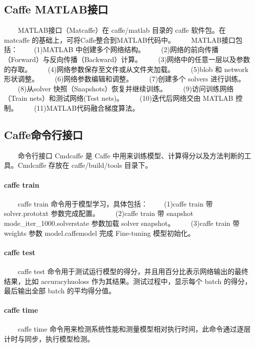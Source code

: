 \subsection{ Caffe MATLAB接口}\label{caffe-matlabux63a5ux53e3}

  MATLAB接口（Matcaffe）在 caffe/matlab 目录的 caffe 软件包。在 matcaffe
的基础上，可将Caffe整合到MATLAB代码中。   MATLAB接口包括：   (1)MATLAB
中创建多个网络结构。
  (2)网络的前向传播（Forward）与反向传播（Backward）计算。
  (3)网络中的任意一层以及参数的存取。
  (4)网络参数保存至文件或从文件夹加载。   (5)blob 和 network 形状调整。
  (6)网络参数编辑和调整。   (7)创建多个 solvers 进行训练。   (8)从solver
快照（Snapshots）恢复并继续训练。   (9)访问训练网络（Train
nets）和测试网络(Test nets)。   (10)迭代后网络交由 MATLAB 控制。
  (11)MATLAB代码融合梯度算法。

\subsection{Caffe命令行接口}\label{caffe-ux547dux4ee4ux884cux63a5ux53e3}

  命令行接口 Cmdcaffe 是 Caffe
中用来训练模型、计算得分以及方法判断的工具。Cmdcaffe 存放在
caffe/build/tools 目录下。

\paragraph{caffe train}\label{caffe-train}

  caffe train 命令用于模型学习，具体包括：   (1)caffe train 带
solver.prototxt 参数完成配置。   (2)caffe train 带 snapshot
mode\_iter\_1000.solverstate 参数加载 solver snapshot。   (3)caffe train
带 weights 参数 model.caffemodel 完成 Fine-tuning 模型初始化。

\paragraph{ caffe test}\label{caffe-test}

  caffe test
命令用于测试运行模型的得分，并且用百分比表示网络输出的最终结果，比如
accuracyhuoloss 作为其结果。测试过程中，显示每个 batch
的得分，最后输出全部 batch 的平均得分值。

\paragraph{ caffe time}\label{caffe-time}

  caffe time
命令用来检测系统性能和测量模型相对执行时间，此命令通过逐层计时与同步，执行模型检测。

